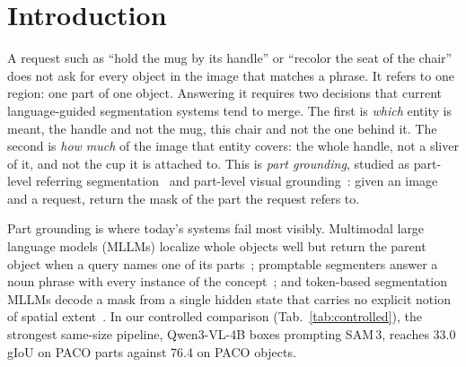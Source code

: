 \section{Introduction}
\label{sec:intro}

A request such as ``hold the mug by its handle'' or ``recolor the seat of the chair'' does not ask for every object
in the image that matches a phrase. It refers to one region: one part of one object. Answering it requires two
decisions that current language-guided segmentation systems tend to merge. The first is \emph{which} entity is
meant, the handle and not the mug, this chair and not the one behind it. The second is \emph{how much} of the image
that entity covers: the whole handle, not a sliver of it, and not the cup it is attached to. This is \emph{part grounding}, studied as part-level referring segmentation~\cite{mres,instructpart} and part-level
visual grounding~\cite{ophrg,partonomy}: given an image and a request, return the mask of the part the request
refers to.

Part grounding is where today's systems fail most visibly. Multimodal large language models (MLLMs) localize whole
objects well but return the parent object when a query names one of its parts~\cite{ophrg}; promptable segmenters
answer a noun phrase with every instance of the concept~\cite{sam3}; and token-based segmentation MLLMs decode a
mask from a single hidden state that carries no explicit notion of spatial extent~\cite{lisa,sa2va,attnseg}. In our
controlled comparison (Tab.~\ref{tab:controlled}), the strongest same-size pipeline, Qwen3-VL-4B boxes prompting
SAM\,3, reaches 33.0 gIoU on PACO parts against 76.4 on PACO objects.

